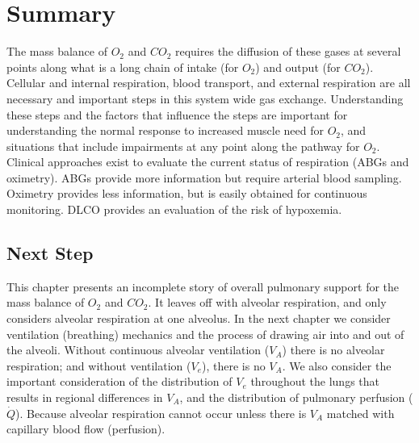 \section{Summary}

The mass balance of $O_2$ and $CO_2$ requires the diffusion of these gases at several points along what is a long chain of intake (for $O_2$) and output (for $CO_2$). Cellular and internal respiration, blood transport, and external respiration are all necessary and important steps in this system wide gas exchange. Understanding these steps and the factors that influence the steps are important for understanding the normal response to increased muscle need for $O_2$, and situations that include impairments at any point along the pathway for $O_2$. Clinical approaches exist to evaluate the current status of respiration (ABGs and oximetry). ABGs provide more information but require arterial blood sampling. Oximetry provides less information, but is easily obtained for continuous monitoring. DLCO provides an evaluation of the risk of hypoxemia. 


\subsection{Next Step}

This chapter presents an incomplete story of overall pulmonary support for the mass balance of $O_2$ and $CO_2$. It leaves off with alveolar respiration, and only considers alveolar respiration at one alveolus. In the next chapter we consider ventilation (breathing) mechanics and the process of drawing air into and out of the alveoli. Without continuous alveolar ventilation ($V_A$) there is no alveolar respiration; and without ventilation ($V_e$), there is no $V_A$. We also consider the important consideration of the distribution of $V_e$ throughout the lungs that results in regional differences in $V_A$, and the distribution of pulmonary perfusion ($\dot{Q}$). Because alveolar respiration cannot occur unless there is $V_A$ matched with capillary blood flow (perfusion). 


\printbibliography[heading=subbibintoc]